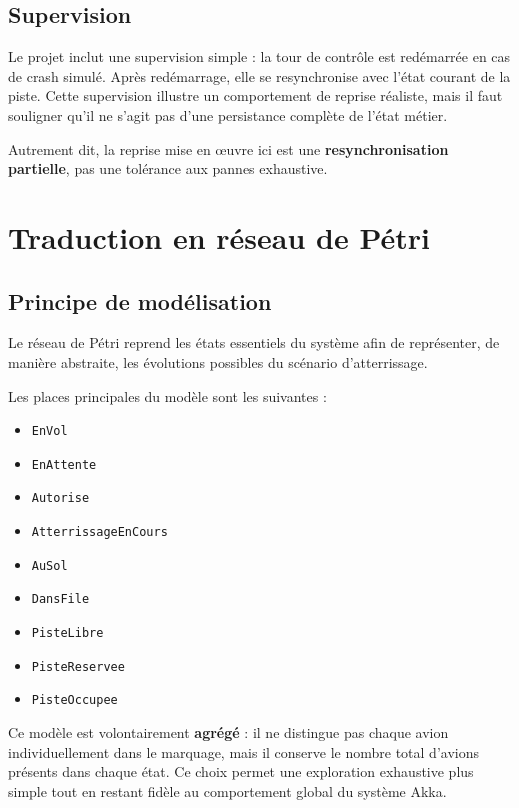 \documentclass[11pt,a4paper]{article}
\begin{document}
\subsection{Supervision}

Le projet inclut une supervision simple : la tour de contrôle est redémarrée en cas de crash simulé. Après redémarrage, elle se resynchronise avec l'état courant de la piste. Cette supervision illustre un comportement de reprise réaliste, mais il faut souligner qu'il ne s'agit pas d'une persistance complète de l'état métier.

Autrement dit, la reprise mise en œuvre ici est une \textbf{resynchronisation partielle}, pas une tolérance aux pannes exhaustive.

\section{Traduction en réseau de Pétri}

\subsection{Principe de modélisation}

Le réseau de Pétri reprend les états essentiels du système afin de représenter, de manière abstraite, les évolutions possibles du scénario d'atterrissage.

Les places principales du modèle sont les suivantes :
\begin{itemize}
    \item \texttt{EnVol}
    \item \texttt{EnAttente}
    \item \texttt{Autorise}
    \item \texttt{AtterrissageEnCours}
    \item \texttt{AuSol}
    \item \texttt{DansFile}
    \item \texttt{PisteLibre}
    \item \texttt{PisteReservee}
    \item \texttt{PisteOccupee}
\end{itemize}

Ce modèle est volontairement \textbf{agrégé} : il ne distingue pas chaque avion individuellement dans le marquage, mais il conserve le nombre total d'avions présents dans chaque état. Ce choix permet une exploration exhaustive plus simple tout en restant fidèle au comportement global du système Akka.
\end{document}

